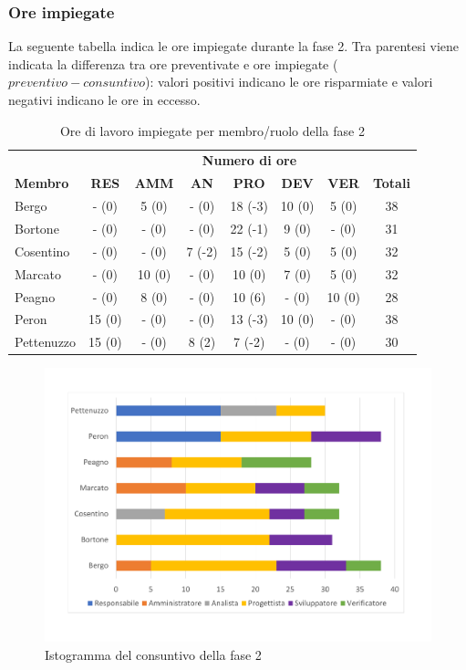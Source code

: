 	\subsubsection{Ore impiegate}
La seguente tabella indica le ore impiegate durante la fase 2. Tra parentesi viene indicata la differenza tra ore preventivate e ore impiegate ($preventivo - consuntivo$): valori positivi indicano le ore risparmiate e valori negativi indicano le ore in eccesso.

		\begin{table}[H]
			\centering
		\begin{tabular}{| l | c c c c c c | c |}
			\rowcolor{LightBlue}
			& \multicolumn{7}{c}{\textbf{\color{white}Numero di ore}}	\\
	
			\rowcolor{LightBlue}
			\textbf{\color{white}Membro}
			& \textbf{\color{white}RES}
			& \textbf{\color{white}AMM}
			& \textbf{\color{white}AN}
			& \textbf{\color{white}PRO}
			& \textbf{\color{white}DEV}
			& \textbf{\color{white}VER}
			& \textbf{\color{white}Totali}\\
			Bergo     		& -  (0)		& 5  (0) 	& -  (0) 		& 18 (-3) & 10 (0) & 5  (0) 	& 38\\
			Bortone   		& -  (0)		& -  (0) 	& -  (0) 		& 22 (-1) & 9 (0) & -  (0)	& 31\\
			Cosentino 		& -  (0)	 	& -  (0) 	& 7  (-2) 		& 15 (-2) & 5 (0) & 5  (0)	& 32\\
			Marcato   		& -  (0) 		& 10  (0) 	& -  (0) 		& 10 (0) & 7 (0) & 5  (0)	& 32\\
			Peagno    		& -  (0) 		& 8  (0) 	& -  (0) 		& 10 (6) & - (0) & 10  (0)	& 28\\
			Peron     		& 15  (0)		& -  (0) 	& -  (0) 		& 13 (-3) & 10 (0) & -  (0)	& 38\\
			Pettenuzzo 		& 15  (0) 		& -  (0) 	& 8  (2) 		& 7 (-2) & - (0) & -  (0)	& 30\\ \hline
		\end{tabular}
		\caption{Ore di lavoro impiegate per membro/ruolo della fase 2}
	\end{table}
	
	\begin{figure}[H]
		\centering
		\includegraphics[scale=0.45]{images/consuntivoRP.pdf}
		\caption{Istogramma del consuntivo della fase 2}
	\end{figure}
	
